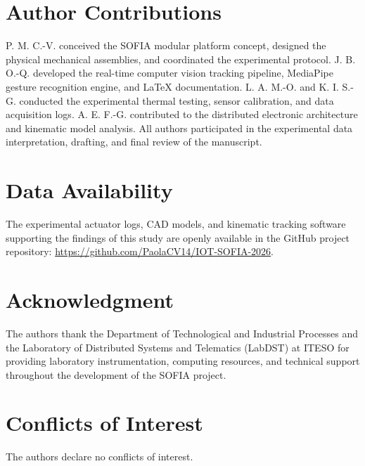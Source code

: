 \documentclass[lettersize,journal]{IEEEtran}
\begin{document}

\section*{Author Contributions}
P. M. C.-V. conceived the SOFIA modular platform concept, designed the physical mechanical assemblies, and coordinated the experimental protocol. J. B. O.-Q. developed the real-time computer vision tracking pipeline, MediaPipe gesture recognition engine, and LaTeX documentation. L. A. M.-O. and K. I. S.-G. conducted the experimental thermal testing, sensor calibration, and data acquisition logs. A. E. F.-G. contributed to the distributed electronic architecture and kinematic model analysis. All authors participated in the experimental data interpretation, drafting, and final review of the manuscript.

\section*{Data Availability}
The experimental actuator logs, CAD models, and kinematic tracking software supporting the findings of this study are openly available in the GitHub project repository: \url{https://github.com/PaolaCV14/IOT-SOFIA-2026}.

\section*{Acknowledgment}
The authors thank the Department of Technological and Industrial Processes and the Laboratory of Distributed Systems and Telematics (LabDST) at ITESO for providing laboratory instrumentation, computing resources, and technical support throughout the development of the SOFIA project.

\section*{Conflicts of Interest}
The authors declare no conflicts of interest.

\balance



\end{document}
